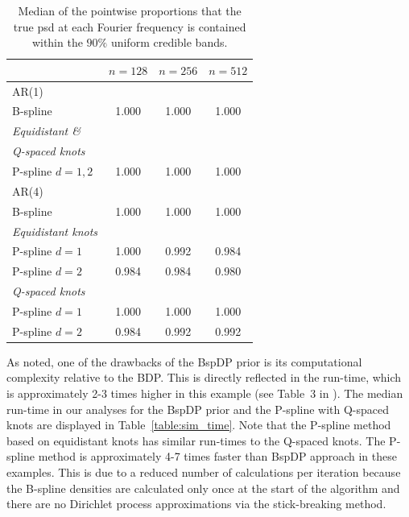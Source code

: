 \documentclass[twocolumn,final]{svjour3}
\begin{document}
\begin{table}
	\centering
		\begin{tabular}{lccc}
			\toprule
			& $n=128$ & $n=256$ & $n=512$ \\ \hline
			AR(1)     &  &  &  \\ 
			B-spline &  1.000 & 1.000 & 1.000 \\
			\textit{Equidistant \&}& & &   \\
			\textit{Q-spaced knots}& & &   \\
			\hspace{0.5em}P-spline $d=1,2$ & 1.000 & 1.000 & 1.000  \\ \hline	 		      
			AR(4)     &  &  &  \\ 
			B-spline &  1.000 & 1.000 & 1.000 \\
			\textit{Equidistant knots}& & &   \\
			\hspace{0.5em}P-spline $d=1$ &  1.000 & 0.992 & 0.984 \\
			\hspace{0.5em}P-spline $d=2$&  0.984 & 0.984 & 0.980 \\
			\textit{Q-spaced knots}& & &   \\	
			\hspace{0.5em}P-spline $d=1$ & 1.000 & 1.000 & 1.000 \\
			\hspace{0.5em}P-spline $d=2$ & 0.984 & 0.992 & 0.992\\	
			\bottomrule
		\end{tabular}
	\caption{Median of the pointwise  proportions that the true psd at each Fourier frequency is contained within the $90\%$ uniform credible bands.}
	\label{table:sim_covPbb_median}
\end{table}



As \cite{Edwards2019} noted, one of the drawbacks of the BspDP prior  is its computational complexity relative to the BDP.  This is directly reflected in the run-time, which is approximately 2-3 times higher in this example (see Table~3 in \cite{Edwards2019}).  The median run-time in our analyses for the BspDP prior and the P-spline with Q-spaced knots are displayed in Table~\ref{table:sim_time}.  Note that the P-spline method based on equidistant knots has similar run-times to the Q-spaced knots.  The P-spline method is approximately 4-7 times faster than BspDP approach in these examples.  This is due to a reduced number of calculations  per iteration because the B-spline densities are calculated only  once at the start of the algorithm and there are no Dirichlet process approximations via the stick-breaking method.  
\end{document}
